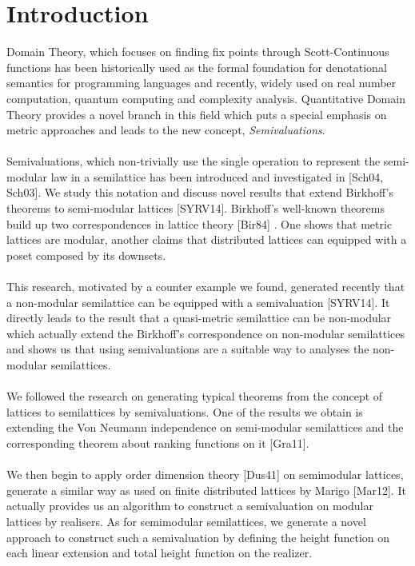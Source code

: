 \documentclass{article}
\begin{document}
\section{Introduction}
Domain Theory, which focuses on finding fix points through Scott-Continuous functions has been historically used as the formal foundation for denotational semantics for programming languages and recently, widely used on real number computation, quantum computing and complexity analysis. Quantitative Domain Theory provides a novel branch in this field which puts a special emphasis on metric approaches and leads to the new concept, {\it Semivaluations}.\\\\
Semivaluations, which non-trivially use the single operation to represent the semi-modular law in a semilattice has been introduced and investigated in [Sch04, Sch03]. We study this notation and discuss novel results that extend Birkhoff's theorems to semi-modular lattices [SYRV14]. Birkhoff's well-known theorems build up two correspondences in lattice theory [Bir84] . One shows that metric lattices are modular, another claims that distributed lattices can equipped with a poset composed by its downsets. \\\\
This research, motivated by a counter example we found,  generated recently that a non-modular semilattice can be equipped with a semivaluation  [SYRV14]. It directly leads to the result that a quasi-metric semilattice can be non-modular which actually extend the Birkhoff's correspondence on non-modular semilattices and shows us that using semivaluations are a suitable way to analyses the non-modular semilattices.\\\\ 
We followed the research on generating typical theorems from the concept of lattices to semilattices by semivaluations. One of the results we obtain is extending the Von Neumann independence on semi-modular semilattices and the corresponding theorem about ranking functions on it [Gra11].\\\\
We then begin to apply order dimension theory [Dus41] on semimodular lattices, generate a similar way as used on finite distributed lattices by Marigo [Mar12]. It  actually provides us an algorithm to construct a semivaluation on modular lattices by realisers. As for semimodular semilattices, we generate a novel approach to construct such a semivaluation by defining the height function on each linear extension and total height function on the realizer. 
\end{document}
